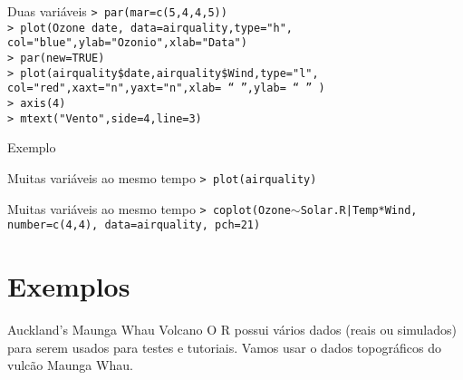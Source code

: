 \documentclass{beamer}
\begin{document}
\begin{frame}{Duas variáveis}
\texttt{>  par(mar=c(5,4,4,5))\\
> plot(Ozone~date, data=airquality,type="h", col="blue",ylab="Ozonio",xlab="Data")\\
> par(new=TRUE)\\
> plot(airquality\$date,airquality\$Wind,type="l", col="red",xaxt="n",yaxt="n",xlab= ``  '',ylab= ``  '' )\\
> axis(4)\\
> mtext("Vento",side=4,line=3)}\\
\end{frame}

\begin{frame}{Exemplo}
\centering
{}
  
\end{frame}

\begin{frame}{Muitas variáveis ao mesmo tempo}
\texttt{> plot(airquality)}

\begin{center}
\end{center}
 
\end{frame}

\begin{frame}{Muitas variáveis ao mesmo tempo}
\texttt{> coplot(Ozone$\sim$Solar.R|Temp*Wind, number=c(4,4), data=airquality, pch=21)}
\begin{center}
   
\end{center}

\end{frame}
\section{Exemplos}

\begin{frame}{Auckland's Maunga Whau Volcano}
  O R possui vários dados (reais ou simulados) para serem usados para testes
  e tutoriais. Vamos usar o dados topográficos do vulcão Maunga Whau.

  \begin{center}
  \end{center}
  
\end{frame}
\end{document}
